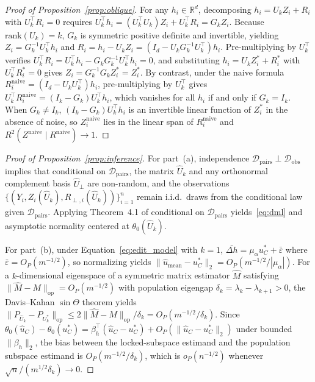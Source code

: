 \documentclass[11pt]{article}
\begin{document}
\begin{proof}[Proof of Proposition~\ref{prop:oblique}]
For any $h_i \in \mathbb{R}^d$, decomposing $h_i = U_k Z_i + R_i$ with $U_k^\top R_i = 0$ requires $U_k^\top h_i = (U_k^\top U_k)Z_i + U_k^\top R_i = G_k Z_i$. Because $\mathrm{rank}(U_k) = k$, $G_k$ is symmetric positive definite and invertible, yielding $Z_i = G_k^{-1}U_k^\top h_i$ and $R_i = h_i - U_k Z_i = (I_d - U_k G_k^{-1} U_k^\top)h_i$. Pre-multiplying by $U_k^\top$ verifies $U_k^\top R_i = U_k^\top h_i - G_k G_k^{-1}U_k^\top h_i = 0$, and substituting $h_i = U_k Z_i^* + R_i^*$ with $U_k^\top R_i^* = 0$ gives $Z_i = G_k^{-1}G_k Z_i^* = Z_i^*$. By contrast, under the naive formula $R_i^{\mathrm{naive}} = (I_d - U_k U_k^\top)h_i$, pre-multiplying by $U_k^\top$ gives $U_k^\top R_i^{\mathrm{naive}} = (I_k - G_k)U_k^\top h_i$, which vanishes for all $h_i$ if and only if $G_k = I_k$. When $G_k \neq I_k$, $(I_k - G_k)U_k^\top h_i$ is an invertible linear function of $Z_i^*$ in the absence of noise, so $Z_i^{\mathrm{naive}}$ lies in the linear span of $R_i^{\mathrm{naive}}$ and $R^2(Z^{\mathrm{naive}} \mid R^{\mathrm{naive}}) \to 1$.
\end{proof}

\begin{proof}[Proof of Proposition~\ref{prop:inference}]
For part~(a), independence $\mathcal{D}_{\mathrm{pairs}} \perp \mathcal{D}_{\mathrm{obs}}$ implies that conditional on $\mathcal{D}_{\mathrm{pairs}}$, the matrix $\hat{U}_k$ and any orthonormal complement basis $\hat{U}_\perp$ are non-random, and the observations $\{(Y_i, Z_i(\hat{U}_k), R_{\perp, i}(\hat{U}_k))\}_{i=1}^n$ remain i.i.d.\ draws from the conditional law given $\mathcal{D}_{\mathrm{pairs}}$. Applying Theorem~4.1 of \citet{chernozhukov2018double} conditional on $\mathcal{D}_{\mathrm{pairs}}$ yields~\eqref{eq:dml} and asymptotic normality centered at $\theta_0(\hat{U}_k)$.

For part~(b), under Equation~\eqref{eq:edit_model} with $k = 1$, $\bar{\Delta h} = \mu_\alpha u_C^* + \bar{\varepsilon}$ where $\bar{\varepsilon} = O_P(m^{-1/2})$, so normalizing yields $\|\hat{u}_{\mathrm{mean}} - u_C^*\|_2 = O_P(m^{-1/2}/|\mu_\alpha|)$. For a $k$-dimensional eigenspace of a symmetric matrix estimator $\hat{M}$ satisfying $\|\hat{M} - M\|_{\mathrm{op}} = O_P(m^{-1/2})$ with population eigengap $\delta_k = \lambda_k - \lambda_{k+1} > 0$, the Davis--Kahan $\sin\Theta$ theorem \citep{davis1970rotation} yields $\|P_{\hat{U}_k} - P_{U_k^*}\|_{\mathrm{op}} \le 2\|\hat{M} - M\|_{\mathrm{op}}/\delta_k = O_P(m^{-1/2}/\delta_k)$. Since $\theta_0(\hat{u}_C) - \theta_0(u_C^*) = \beta_h^\top(\hat{u}_C - u_C^*) + O_P(\|\hat{u}_C - u_C^*\|_2)$ under bounded $\|\beta_h\|_2$, the bias between the locked-subspace estimand and the population subspace estimand is $O_P(m^{-1/2}/\delta_k)$, which is $o_P(n^{-1/2})$ whenever $\sqrt{n}/(m^{1/2}\delta_k) \to 0$.
\end{proof}
\end{document}
